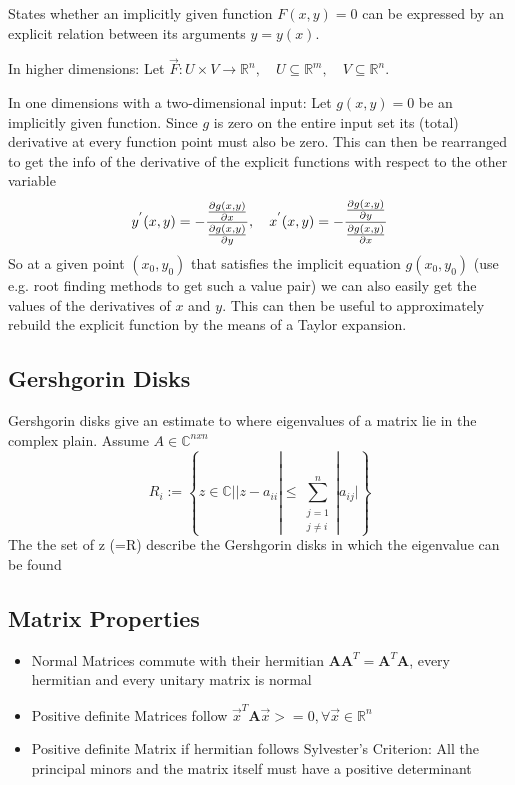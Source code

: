 \documentclass[
    a4paper,
    11pt
]{article}
\begin{document}
States whether an implicitly given function $F(x, y) = 0$ can be expressed by an
explicit relation between its arguments $y = y(x)$.

In higher dimensions: Let $\vec{F}: U \times V \to \mathbb{R}^n, \quad U
\subseteq \mathbb{R}^m, \quad V \subseteq \mathbb{R}^n$.

In one dimensions with a two-dimensional input: Let $g(x, y) = 0$ be an
implicitly given function. Since $g$ is zero on the entire input set its (total)
derivative at every function point must also be zero. This can then be
rearranged to get the info of the derivative of the explicit functions with
respect to the other variable
\begin{equation}
    y^{'}(x, y) = - \frac{\pdv{g(x, y)}{x}}{\pdv{g(x, y)}{y}}, \quad
    x^{'}(x, y) = - \frac{\pdv{g(x, y)}{y}}{\pdv{g(x, y)}{x}}
\end{equation}
So at a given point $(x_0, y_0)$ that satisfies the implicit equation $g(x_0,
y_0)$ (use e.g. root finding methods to get such a value pair) we can also
easily get the values of the derivatives of $x$ and $y$. This can then be useful
to approximately rebuild the explicit function by the means of a Taylor
expansion.


\subsection{Gershgorin Disks}

Gershgorin disks give an estimate to where eigenvalues of a matrix lie in the
complex plain. Assume $A \in \mathbb{C}^{n x n}$
\begin{equation}
    R_i := \left\{z \in{} \mathbb{C} |
    |z - a_{ii}| \leq{} \sum_{\substack{j=1 \\ j\neq{} i}}^{n}|a_{ij}| \right\}
\end{equation}
The the set of z (=R) describe the Gershgorin disks in which the eigenvalue can
be found

\subsection{Matrix Properties}

\begin{itemize}
    \item Normal Matrices commute with their hermitian $\mathbf{AA}^T =
        \mathbf{A}^T \mathbf{A}$, every hermitian and every unitary matrix is
        normal
    \item Positive definite Matrices follow $\vec{x}^T \mathbf{A} \vec{x} > =0,
        \forall \vec{x} \in \mathbb{R}^n$
    \item Positive definite Matrix if hermitian follows Sylvester's Criterion:
        All the principal minors and the matrix itself must have a positive
        determinant
\end{itemize}
\end{document}
